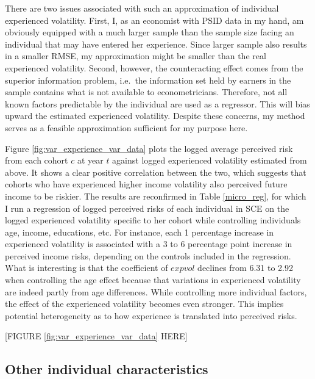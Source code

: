 \documentclass[12pt,notitlepage,onecolumn,aps,pra]{article}
\begin{document}
There are two issues associated with such an approximation of individual
experienced volatility. First, I, as an economist with PSID data in my
hand, am obviously equipped with a much larger sample than the sample
size facing an individual that may have entered her experience. Since
larger sample also results in a smaller RMSE, my approximation might be
smaller than the real experienced volatility. Second, however, the
counteracting effect comes from the superior information problem,
i.e.~the information set held by earners in the sample contains what is
not available to econometricians. Therefore, not all known factors
predictable by the individual are used as a regressor. This will bias
upward the estimated experienced volatility. Despite these concerns, my
method serves as a feasible approximation sufficient for my purpose
here.

Figure \ref{fig:var_experience_var_data} plots the logged average
perceived risk from each cohort \(c\) at year \(t\) against logged
experienced volatility estimated from above. It shows a clear positive
correlation between the two, which suggests that cohorts who have
experienced higher income volatility also perceived future income to be
riskier. The results are reconfirmed in Table \ref{micro_reg}, for which
I run a regression of logged perceived risks of each individual in SCE
on the logged experienced volatility specific to her cohort while
controlling individuals age, income, educations, etc. For instance, each
1 percentage increase in experienced volatility is associated with a 3
to 6 percentage point increase in perceived income risks, depending on
the controls included in the regression. What is interesting is that the
coefficient of \(expvol\) declines from 6.31 to 2.92 when controlling
the age effect because that variations in experienced volatility are
indeed partly from age differences. While controlling more individual
factors, the effect of the experienced volatility becomes even stronger.
This implies potential heterogeneity as to how experience is translated
into perceived risks.

{[}FIGURE \ref{fig:var_experience_var_data} HERE{]}



    \hypertarget{other-individual-characteristics}{%
\subsection{Other individual
characteristics}\label{other-individual-characteristics}}
\end{document}
